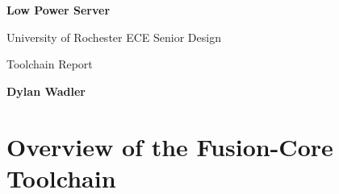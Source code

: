 \documentclass[letterpaper, 11pt, twoside]{article}
\begin{document}
\begin{titlepage}
	\begin{center}

	\vspace*{1cm}
	\Huge
	\textbf{Low Power Server}

	\vspace{0.5cm}
	\LARGE
	University of Rochester ECE Senior Design 

	\vspace{1cm}
	\LARGE
	Toolchain Report
	\vspace{1.5cm}
	
	\textbf{Dylan Wadler} 
	\vfill
	
	
	\end{center}
\end{titlepage}
\clearpage

\tableofcontents

\clearpage

\section[Overview]{Overview of the Fusion-Core Toolchain}
\subsection{}
\end{document}
